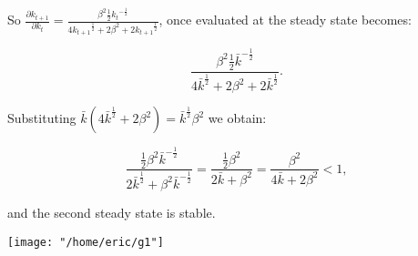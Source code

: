 \documentclass[11pt,twoside,a4paper]{article}
\begin{document}
So $\frac{\partial k_{t+1}}{\partial k_t} = \frac{\beta^2 \frac{1}{2} {k_t}^{-\frac{1}{2}}}{4 {k_{t+1}}^\frac{1}{2} + 2 \beta^2 + 2 {k_{t+1}}^\frac{1}{2}}$, once evaluated at the steady state becomes:

$$\frac{\beta^2 \frac{1}{2} {\bar{k}}^{-\frac{1}{2}}}{4 {\bar{k}}^\frac{1}{2} + 2 \beta^2 + 2 {\bar{k}}^\frac{1}{2}}.$$

Substituting $\bar{k}\left(4 {\bar{k}}^\frac{1}{2} + 2\beta^2\right) = {\bar{k}}^\frac{1}{2}\beta^2$ we obtain:

$$\frac{\frac{1}{2} \beta^2 \bar{k}^{-\frac{1}{2}}}{2 \bar{k}^\frac{1}{2} + \beta^2 \bar{k}^{-\frac{1}{2}}} = \frac{\frac{1}{2} \beta^2}{2\bar{k} + \beta^2} = \frac{\beta^2}{4\bar{k} +2\beta^2} < 1,$$

and the second steady state is stable.
\begin{center}
\texttt{[image: "/home/eric/g1"]}
\end{center}
\end{document}
